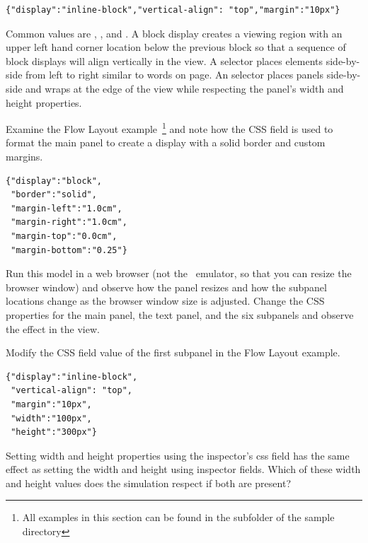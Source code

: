 \begin{listing}
\begin{verbatim}
{"display":"inline-block","vertical-align": "top","margin":"10px"}
\end{verbatim}
\end{listing}

Common  values are , , and . A block display creates a viewing region with an upper left hand corner location below the previous block so that a sequence of block displays will align vertically in the view. A  selector places elements side-by-side from left to right similar to words on page. An  selector places panels side-by-side and wraps at the edge of the view while respecting the panel's width and height properties.

Examine the Flow Layout example~\footnote{All examples in this section can be found in the  subfolder of the  sample directory} and note how the CSS field is used to format the main panel to create a display with a solid border and custom margins.

\begin{listing}
\begin{verbatim}
{"display":"block",
 "border":"solid",
 "margin-left":"1.0cm",
 "margin-right":"1.0cm",
 "margin-top":"0.0cm",
 "margin-bottom":"0.25"}
\end{verbatim}
\end{listing}
Run this model in a web browser (not the \ejs\ emulator, so that you can resize the browser window) and observe how the panel resizes and how the subpanel locations change as the browser window size is adjusted.  Change the CSS properties for the main panel, the text panel, and the six subpanels and observe the effect in the view.

\begin{exercise}\label{ex:04JavatoJS/css}
Modify the CSS field value of the first subpanel in the  Flow Layout example.

\begin{listing}
\begin{verbatim}
{"display":"inline-block",
 "vertical-align": "top",
 "margin":"10px",
 "width":"100px",
 "height":"300px"}
\end{verbatim}
\end{listing}
Setting width and height properties using the inspector's css field has the same effect as setting the width and height using inspector fields.  Which of these width and height values does the simulation respect if both are present?
\end{exercise}

